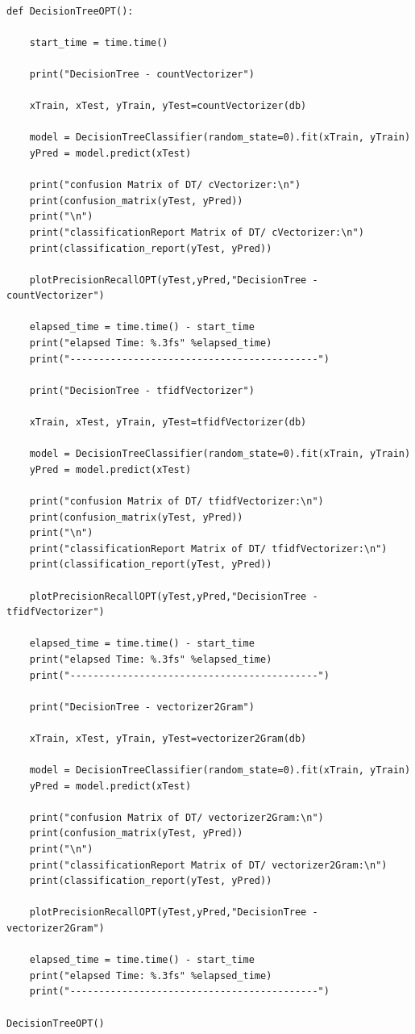 \documentclass{article}
\begin{document}
\begin{verbatim}

def DecisionTreeOPT():
    
    start_time = time.time()
        
    print("DecisionTree - countVectorizer")
    
    xTrain, xTest, yTrain, yTest=countVectorizer(db)
    
    model = DecisionTreeClassifier(random_state=0).fit(xTrain, yTrain)
    yPred = model.predict(xTest)
    
    print("confusion Matrix of DT/ cVectorizer:\n")
    print(confusion_matrix(yTest, yPred))
    print("\n")
    print("classificationReport Matrix of DT/ cVectorizer:\n")
    print(classification_report(yTest, yPred))
    
    plotPrecisionRecallOPT(yTest,yPred,"DecisionTree - countVectorizer")
    
    elapsed_time = time.time() - start_time
    print("elapsed Time: %.3fs" %elapsed_time)
    print("-------------------------------------------")
    
    print("DecisionTree - tfidfVectorizer")
    
    xTrain, xTest, yTrain, yTest=tfidfVectorizer(db)
    
    model = DecisionTreeClassifier(random_state=0).fit(xTrain, yTrain)
    yPred = model.predict(xTest)
    
    print("confusion Matrix of DT/ tfidfVectorizer:\n")
    print(confusion_matrix(yTest, yPred))
    print("\n")
    print("classificationReport Matrix of DT/ tfidfVectorizer:\n")
    print(classification_report(yTest, yPred))
    
    plotPrecisionRecallOPT(yTest,yPred,"DecisionTree - tfidfVectorizer")
    
    elapsed_time = time.time() - start_time
    print("elapsed Time: %.3fs" %elapsed_time)
    print("-------------------------------------------")

    print("DecisionTree - vectorizer2Gram")
    
    xTrain, xTest, yTrain, yTest=vectorizer2Gram(db)
    
    model = DecisionTreeClassifier(random_state=0).fit(xTrain, yTrain)
    yPred = model.predict(xTest)
    
    print("confusion Matrix of DT/ vectorizer2Gram:\n")
    print(confusion_matrix(yTest, yPred))
    print("\n")
    print("classificationReport Matrix of DT/ vectorizer2Gram:\n")
    print(classification_report(yTest, yPred))
    
    plotPrecisionRecallOPT(yTest,yPred,"DecisionTree - vectorizer2Gram")
    
    elapsed_time = time.time() - start_time
    print("elapsed Time: %.3fs" %elapsed_time)
    print("-------------------------------------------")
    
DecisionTreeOPT()
\end{verbatim}
\end{document}
